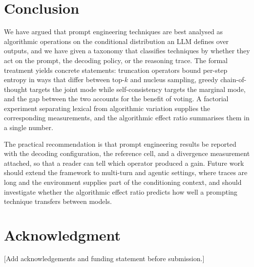 \documentclass[conference]{IEEEtran}
\begin{document}
\section{Conclusion}
\label{sec:conclusion}

We have argued that prompt engineering techniques are best analysed as algorithmic operations on the conditional distribution an LLM defines over outputs, and we have given a taxonomy that classifies techniques by whether they act on the prompt, the decoding policy, or the reasoning trace. The formal treatment yields concrete statements: truncation operators bound per-step entropy in ways that differ between top-$k$ and nucleus sampling, greedy chain-of-thought targets the joint mode while self-consistency targets the marginal mode, and the gap between the two accounts for the benefit of voting. A factorial experiment separating lexical from algorithmic variation supplies the corresponding measurements, and the algorithmic effect ratio summarises them in a single number.

The practical recommendation is that prompt engineering results be reported with the decoding configuration, the reference cell, and a divergence measurement attached, so that a reader can tell which operator produced a gain. Future work should extend the framework to multi-turn and agentic settings, where traces are long and the environment supplies part of the conditioning context, and should investigate whether the algorithmic effect ratio predicts how well a prompting technique transfers between models.

\section*{Acknowledgment}
\label{sec:acknowledgment}

\textcolor{BrickRed}{[Add acknowledgements and funding statement before submission.]}
\end{document}
